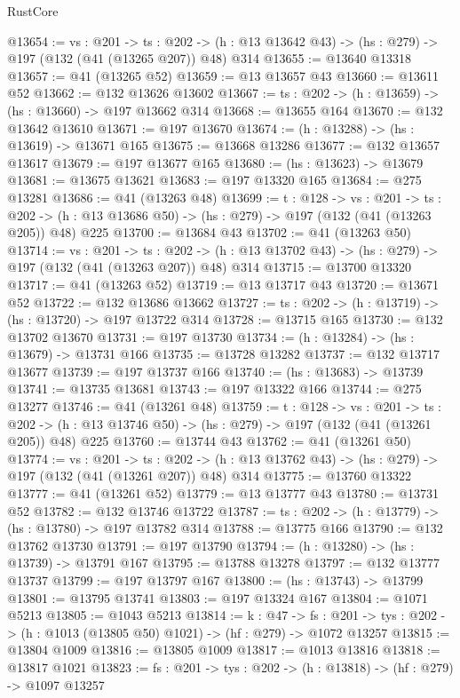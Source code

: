 \begin{lexlean}{RustCore}
\begin{coremodule}
@13654 := {vs : @201} ->
  {ts : @202} -> (h : @13 @13642 @43) -> (hs : @279) -> @197 (@132 (@41 (@13265 @207)) @48) @314
@13655 := @13640 @13318
@13657 := @41 (@13265 @52)
@13659 := @13 @13657 @43
@13660 := @13611 @52
@13662 := @132 @13626 @13602
@13667 := {ts : @202} -> (h : @13659) -> (hs : @13660) -> @197 @13662 @314
@13668 := @13655 @164
@13670 := @132 @13642 @13610
@13671 := @197 @13670
@13674 := (h : @13288) -> (hs : @13619) -> @13671 @165
@13675 := @13668 @13286
@13677 := @132 @13657 @13617
@13679 := @197 @13677 @165
@13680 := (hs : @13623) -> @13679
@13681 := @13675 @13621
@13683 := @197 @13320 @165
@13684 := @275 @13281
@13686 := @41 (@13263 @48)
@13699 := {t : @128} ->
  {vs : @201} ->
  {ts : @202} -> (h : @13 @13686 @50) -> (hs : @279) -> @197 (@132 (@41 (@13263 @205)) @48) @225
@13700 := @13684 @43
@13702 := @41 (@13263 @50)
@13714 := {vs : @201} ->
  {ts : @202} -> (h : @13 @13702 @43) -> (hs : @279) -> @197 (@132 (@41 (@13263 @207)) @48) @314
@13715 := @13700 @13320
@13717 := @41 (@13263 @52)
@13719 := @13 @13717 @43
@13720 := @13671 @52
@13722 := @132 @13686 @13662
@13727 := {ts : @202} -> (h : @13719) -> (hs : @13720) -> @197 @13722 @314
@13728 := @13715 @165
@13730 := @132 @13702 @13670
@13731 := @197 @13730
@13734 := (h : @13284) -> (hs : @13679) -> @13731 @166
@13735 := @13728 @13282
@13737 := @132 @13717 @13677
@13739 := @197 @13737 @166
@13740 := (hs : @13683) -> @13739
@13741 := @13735 @13681
@13743 := @197 @13322 @166
@13744 := @275 @13277
@13746 := @41 (@13261 @48)
@13759 := {t : @128} ->
  {vs : @201} ->
  {ts : @202} -> (h : @13 @13746 @50) -> (hs : @279) -> @197 (@132 (@41 (@13261 @205)) @48) @225
@13760 := @13744 @43
@13762 := @41 (@13261 @50)
@13774 := {vs : @201} ->
  {ts : @202} -> (h : @13 @13762 @43) -> (hs : @279) -> @197 (@132 (@41 (@13261 @207)) @48) @314
@13775 := @13760 @13322
@13777 := @41 (@13261 @52)
@13779 := @13 @13777 @43
@13780 := @13731 @52
@13782 := @132 @13746 @13722
@13787 := {ts : @202} -> (h : @13779) -> (hs : @13780) -> @197 @13782 @314
@13788 := @13775 @166
@13790 := @132 @13762 @13730
@13791 := @197 @13790
@13794 := (h : @13280) -> (hs : @13739) -> @13791 @167
@13795 := @13788 @13278
@13797 := @132 @13777 @13737
@13799 := @197 @13797 @167
@13800 := (hs : @13743) -> @13799
@13801 := @13795 @13741
@13803 := @197 @13324 @167
@13804 := @1071 @5213
@13805 := @1043 @5213
@13814 := {k : @47} ->
  {fs : @201} -> {tys : @202} -> (h : @1013 (@13805 @50) @1021) -> (hf : @279) -> @1072 @13257
@13815 := @13804 @1009
@13816 := @13805 @1009
@13817 := @1013 @13816
@13818 := @13817 @1021
@13823 := {fs : @201} -> {tys : @202} -> (h : @13818) -> (hf : @279) -> @1097 @13257

\end{coremodule}
\end{lexlean}
